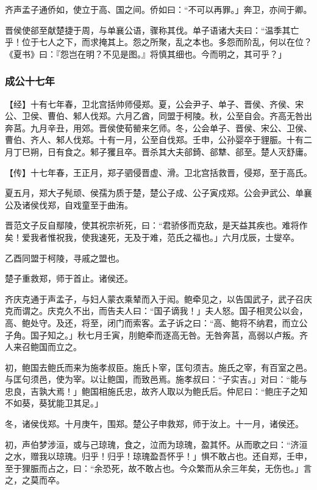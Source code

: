 \documentclass[]{article}
\begin{document}
齐声孟子通侨如，使立于高、国之间。侨如曰：``不可以再罪。」奔卫，亦间于卿。

晋侯使郤至献楚捷于周，与单襄公语，骤称其伐。单子语诸大夫曰：``温季其亡乎！位于七人之下，而求掩其上。怨之所聚，乱之本也。多怨而阶乱，何以在位？《夏书》曰：『怨岂在明？不见是图。』将慎其细也。今而明之，其可乎？」

\hypertarget{header-n1763}{%
\subsubsection{成公十七年}\label{header-n1763}}

【经】十有七年春，卫北宫括帅师侵郑。夏，公会尹子、单子、晋侯、齐侯、宋公、卫侯、曹伯、邾人伐郑。六月乙酋，同盟于柯陵。秋，公至自会。齐高无咎出奔莒。九月辛丑，用郊。晋侯使荀罃来乞师。冬，公会单子、晋侯、宋公、卫侯、曹伯、齐人、邾人伐郑。十有一月，公至自伐郑。壬申，公孙婴卒于貍脤。十有二月丁巳朔，日有食之。邾子玃且卒。晋杀其大夫郤錡、郤犨、郤至。楚人灭舒庸。

【传】十七年春，王正月，郑子驷侵晋虚、滑。卫北宫括救晋，侵郑，至于高氏。

夏五月，郑大子髡顽、侯孺为质于楚，楚公子成、公子寅戍郑。公会尹武公、单襄公及诸侯伐郑，自戏童至于曲洧。

晋范文子反自鄢陵，使其祝宗祈死，曰：``君骄侈而克敌，是天益其疾也。难将作矣！爱我者惟祝我，使我速死，无及于难，范氏之福也。」六月戊辰，士燮卒。

乙酉同盟于柯陵，寻戚之盟也。

楚子重救郑，师于首止。诸侯还。

齐庆克通于声孟子，与妇人蒙衣乘辇而入于闳。鲍牵见之，以告国武子，武子召庆克而谓之。庆克久不出，而告夫人曰：``国子谪我！」夫人怒。国子相灵公以会，高、鲍处守。及还，将至，闭门而索客。孟子诉之曰：``高、鲍将不纳君，而立公子角。国子知之。」秋七月壬寅，刖鲍牵而逐高无咎。无咎奔莒，高弱以卢叛。齐人来召鲍国而立之。

初，鲍国去鲍氏而来为施孝叔臣。施氏卜宰，匡句须吉。施氏之宰，有百室之邑。与匡句须邑，使为宰。以让鲍国，而致邑焉。施孝叔曰：``子实吉。」对曰：``能与忠良，吉孰大焉！」鲍国相施氏忠，故齐人取以为鲍氏后。仲尼曰：``鲍庄子之知不如葵，葵犹能卫其足。」

冬，诸侯伐郑。十月庚午，围郑。楚公子申救郑，师于汝上。十一月，诸侯还。

初，声伯梦涉洹，或与己琼瑰，食之，泣而为琼瑰，盈其怀。从而歌之曰：``济洹之水，赠我以琼瑰。归乎！归乎！琼瑰盈吾怀乎！」惧不敢占也。还自郑，壬申，至于狸脤而占之，曰：``余恐死，故不敢占也。今众繁而从余三年矣，无伤也。」言之，之莫而卒。
\end{document}
